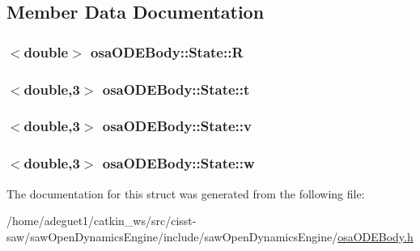 \subsection{Member Data Documentation}
\hypertarget{structosa_o_d_e_body_1_1_state_ac33054b81088a4dd9436b1418da1c92c}{
\subsubsection[{R}]{$<$double$>$ osa\-O\-D\-E\-Body\-::\-State\-::\-R}}\label{structosa_o_d_e_body_1_1_state_ac33054b81088a4dd9436b1418da1c92c}
\hypertarget{structosa_o_d_e_body_1_1_state_a875d11546272dcb6115ab1a4d7855370}{
\subsubsection[{t}]{$<$double,3$>$ osa\-O\-D\-E\-Body\-::\-State\-::t}}\label{structosa_o_d_e_body_1_1_state_a875d11546272dcb6115ab1a4d7855370}
\hypertarget{structosa_o_d_e_body_1_1_state_a6158fd319c583980e491d74b490083f6}{
\subsubsection[{v}]{$<$double,3$>$ osa\-O\-D\-E\-Body\-::\-State\-::v}}\label{structosa_o_d_e_body_1_1_state_a6158fd319c583980e491d74b490083f6}
\hypertarget{structosa_o_d_e_body_1_1_state_af6b430eb6faf7e341b4647b5cd690c07}{
\subsubsection[{w}]{$<$double,3$>$ osa\-O\-D\-E\-Body\-::\-State\-::w}}\label{structosa_o_d_e_body_1_1_state_af6b430eb6faf7e341b4647b5cd690c07}


The documentation for this struct was generated from the following file\-:\begin{DoxyCompactItemize}
\item 
/home/adeguet1/catkin\-\_\-ws/src/cisst-\/saw/saw\-Open\-Dynamics\-Engine/include/saw\-Open\-Dynamics\-Engine/\hyperlink{osa_o_d_e_body_8h}{osa\-O\-D\-E\-Body.\-h}\end{DoxyCompactItemize}

